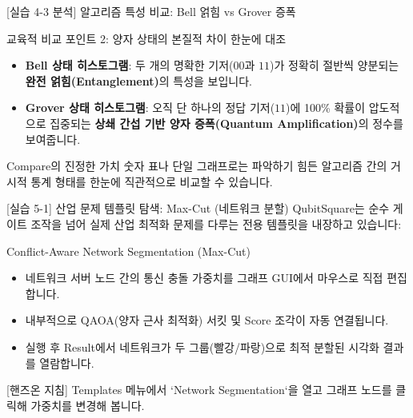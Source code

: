 \documentclass[aspectratio=169, 10pt]{beamer}
\begin{document}
\begin{frame}{[실습 4-3 분석] 알고리즘 특성 비교: Bell 얽힘 vs Grover 증폭}
    \begin{qcblock}{교육적 비교 포인트 2: 양자 상태의 본질적 차이 한눈에 대조}
        \begin{itemize}
            \item \textbf{Bell 상태 히스토그램}:
            두 개의 명확한 기저($00$과 $11$)가 정확히 절반씩 양분되는 \textbf{완전 얽힘(Entanglement)}의 특성을 보입니다.
            \pause
            \item \textbf{Grover 상태 히스토그램}:
            오직 단 하나의 정답 기저($11$)에 100\% 확률이 압도적으로 집중되는 \textbf{상쇄 간섭 기반 양자 증폭(Quantum Amplification)}의 정수를 보여줍니다.
        \end{itemize}
    \end{qcblock}
    \vspace{0.3cm}
    \begin{qctip}{Compare의 진정한 가치}
        숫자 표나 단일 그래프로는 파악하기 힘든 알고리즘 간의 거시적 통계 형태를 한눈에 직관적으로 비교할 수 있습니다.
    \end{qctip}
\end{frame}

\begin{frame}{[실습 5-1] 산업 문제 템플릿 탐색: Max-Cut (네트워크 분할)}
    QubitSquare는 순수 게이트 조작을 넘어 실제 산업 최적화 문제를 다루는 전용 템플릿을 내장하고 있습니다:
    \vspace{0.2cm}
    \begin{qcblock}{Conflict-Aware Network Segmentation (Max-Cut)}
        \begin{itemize}
            \item 네트워크 서버 노드 간의 통신 충돌 가중치를 그래프 GUI에서 마우스로 직접 편집합니다.
            \pause
            \item 내부적으로 QAOA(양자 근사 최적화) 서킷 및 Score 조각이 자동 연결됩니다.
            \pause
            \item 실행 후 Result에서 네트워크가 두 그룹(빨강/파랑)으로 최적 분할된 시각화 결과를 열람합니다.
        \end{itemize}
    \end{qcblock}
    \vspace{0.2cm}
    \begin{qctip}{[핸즈온 지침]}
        Templates 메뉴에서 `Network Segmentation`을 열고 그래프 노드를 클릭해 가중치를 변경해 봅니다.
    \end{qctip}
\end{frame}
\end{document}

